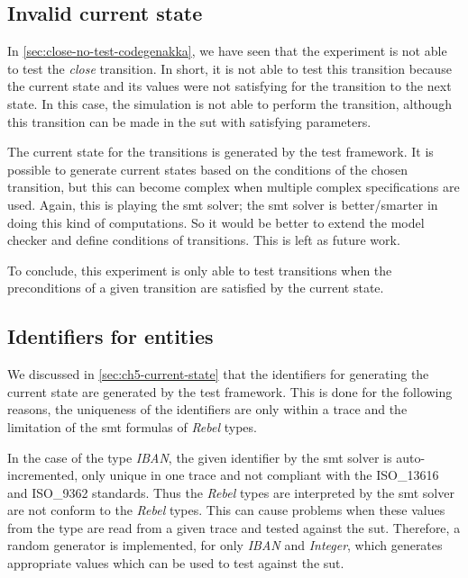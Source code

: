 \subsection{Invalid current state}
In \autoref{sec:close-no-test-codegenakka}, we have seen that the experiment is
not able to test the \textit{close} transition. In short, it is not able to test
this transition because the current state and its values were not satisfying for
the transition to the next state. In this case, the simulation is not able to
perform the transition, although this transition can be made in the \gls{sut}
with satisfying parameters.

The current state for the transitions is generated by the test framework. It is
possible to generate current states based on the conditions of the chosen
transition, but this can become complex when multiple complex specifications are
used. Again, this is playing the \gls{smt} solver; the \gls{smt} solver is
better/smarter in doing this kind of computations. So it would be better to
extend the model checker and define conditions of transitions. This is left as
future work.

To conclude, this experiment is only able to test transitions when the
preconditions of a given transition are satisfied by the current state.


\subsection{Identifiers for entities}
We discussed in \autoref{sec:ch5-current-state} that the identifiers for
generating the current state are generated by the test framework. This is done
for the following reasons, the uniqueness of the identifiers are only within a
trace and the limitation of the \gls{smt} formulas of \textit{Rebel} types.

In the case of the type \textit{IBAN}, the given identifier by the \gls{smt}
solver is auto-incremented, only unique in one trace and not compliant with the
ISO\_13616 and ISO\_9362 standards. Thus the \textit{Rebel} types are
interpreted by the \gls{smt} solver are not conform to the \textit{Rebel} types.
This can cause problems when these values from the type are read from a given
trace and tested against the \gls{sut}. Therefore, a random generator is
implemented, for only \textit{IBAN} and \textit{Integer}, which generates
appropriate values which can be used to test against the \gls{sut}.

